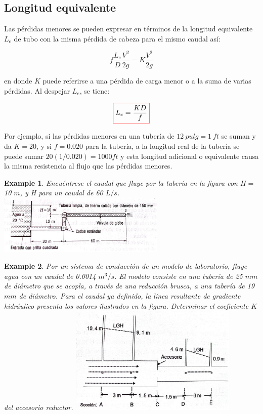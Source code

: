 \documentclass[11pt, oneside]{article}
\newtheorem{exa}{Example}
\begin{document}
\subsection{Longitud equivalente} %
Las p\'erdidas menores se pueden expresar en t\'erminos de la longitud equivalente $L_e$ de tubo con la misma p\'erdida de cabeza para el mismo caudal as\'i:

\begin{equation}
f \frac{L_e }{D} \frac{V^2}{2g} = K \frac{V^2}{2g}
\label{perm11}
\end{equation}

en donde $K$ puede referirse a una p\'erdida de carga menor o a la suma de varias p\'erdidas. Al despejar $L_e$, se tiene:

\begin{equation}
\color{red}\boxed{\color{black} L_e = \frac{KD}{f} }
\label{perm12}
\end{equation}

Por ejemplo, si las p\'erdidas menores en una tuber\'ia de $12\ pulg = 1\ ft$ se suman y da $K=20$, y si $f = 0.020$ para la tuber\'ia, a la longitud real de la tuber\'ia se puede sumar $20(1/0.020)=1000 ft$ y esta longitud adicional o equivalente causa la misma resistencia al flujo que las p\'erdidas menores. 

\begin{shaded}
\begin{exa}
Encu\'entrese el caudal que fluye por la tuber\'ia en la figura con $H =$ 10 $m$, y H para un caudal de 60 $L/s$.
\includegraphics[width=8cm]{exa20.jpeg}
\end{exa}
\end{shaded}


\begin{shaded}
\begin{exa}
Por un sistema de conducci\'on de un modelo de laboratorio, fluye agua con un caudal de 0.0014 $m^3/s$. El modelo consiste en una tuber\'ia de 25 $mm$ de di\'ametro que se acopla, a trav\'es de una reducci\'on brusca, a una tuber\'ia de 19 $mm$ de di\'ametro. Para el caudal ya definido, la l\'inea resultante de gradiente hidr\'aulico presenta los valores ilustrados en la figura. Determinar el coeficiente $K$ del accesorio reductor.
\includegraphics[width=8cm]{exa30.jpeg}
\end{exa}
\end{shaded}

\end{document}
